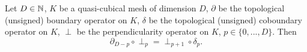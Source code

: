 \begin{proposition}
  Let
    $D \in \mathbb{N}$,
    $K$ be a quasi-cubical mesh of dimension $D$,
    $\partial$ be the topological (unsigned) boundary operator on $K$,
    $\delta$ be the topological (unsigned) coboundary operator on $K$,
    $\perp$ be the perpendicularity operator on $K$,
    $p \in \{0, ..., D\}$.
  Then
  \begin{equation}
    \partial_{D - p} \circ \perp_p = \perp_{p + 1} \circ \delta_p.
  \end{equation}
\end{proposition}
